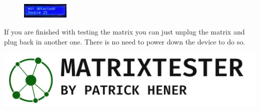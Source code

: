 \documentclass[12pt,landscape,letterpaper]{article}
\begin{document}
\begin{multicols}{3}
\begin{figure}[H]
    \centering
    \includegraphics[width=0.2\textwidth]{media/detection-2.jpg}
\end{figure}

If you are finished with testing the matrix you can just unplug the matrix and plug back in another one. There is no need to power down the device to do so.

\vfill
{\hfill\includegraphics[width=0.9\hsize]{media/Banner.png}\hfill}

\end{multicols}
\end{document}
